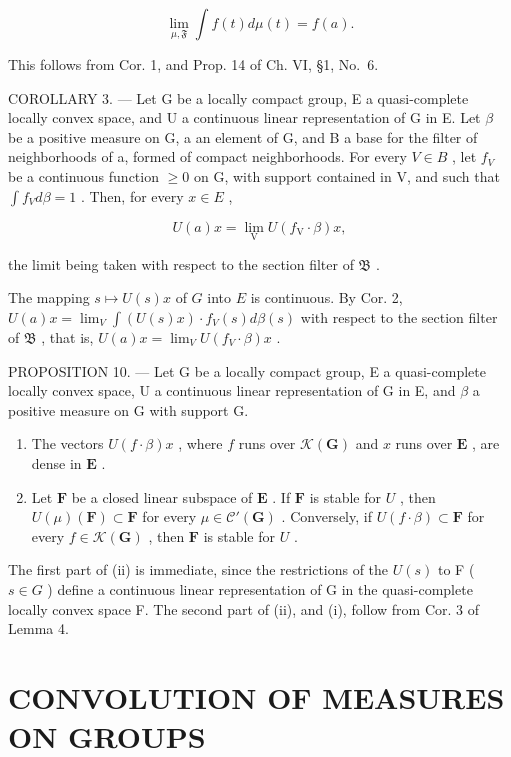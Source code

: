 \[
\lim _ {\mu , \mathfrak {F}} \int f (t) d \mu (t) = f (a).
\]

This follows from Cor. 1, and Prop. 14 of Ch. VI, §1, No.~6.

COROLLARY 3. --- Let G be a locally compact group, E a quasi-complete locally convex space, and U a continuous linear representation of G in E. Let \(\beta\) be a positive measure on G, a an element of G, and B a base for the filter of neighborhoods of a, formed of compact neighborhoods. For every \(V \in B\) , let \(f_{V}\) be a continuous function \(\geqslant 0\) on G, with support contained in V, and such that \(\int f_{V} d\beta = 1\) . Then, for every \(x \in E\) ,

\[
U (a) x = \lim _ {\mathrm{V}} U (f _ {\mathrm{V}} \cdot \beta) x,
\]

the limit being taken with respect to the section filter of \(\mathfrak{B}\) .

The mapping \(s \mapsto U(s)x\) of \(G\) into \(E\) is continuous. By Cor. 2, \(U(a)x = \lim_{V} \int (U(s)x) \cdot f_V(s) d\beta(s)\) with respect to the section filter of \(\mathfrak{B}\) , that is, \(U(a)x = \lim_{V} U(f_V \cdot \beta)x\) .

PROPOSITION 10. --- Let G be a locally compact group, E a quasi-complete locally convex space, U a continuous linear representation of G in E, and \(\beta\) a positive measure on G with support G.

\begin{enumerate}
\def\labelenumi{(\roman{enumi})}
\item
  The vectors \(U(f \cdot \beta)x\) , where \(f\) runs over \(\mathcal{K}(\mathbf{G})\) and \(x\) runs over \(\mathbf{E}\) , are dense in \(\mathbf{E}\) .
\item
  Let \(\mathbf{F}\) be a closed linear subspace of \(\mathbf{E}\) . If \(\mathbf{F}\) is stable for \(U\) , then \(U(\mu)(\mathbf{F}) \subset \mathbf{F}\) for every \(\mu \in \mathcal{C}'(\mathbf{G})\) . Conversely, if \(U(f \cdot \beta) \subset \mathbf{F}\) for every \(f \in \mathcal{K}(\mathbf{G})\) , then \(\mathbf{F}\) is stable for \(U\) .
\end{enumerate}

The first part of (ii) is immediate, since the restrictions of the \(U(s)\) to F ( \(s \in G\) ) define a continuous linear representation of G in the quasi-complete locally convex space F. The second part of (ii), and (i), follow from Cor. 3 of Lemma 4.

\section{CONVOLUTION OF MEASURES ON GROUPS}

